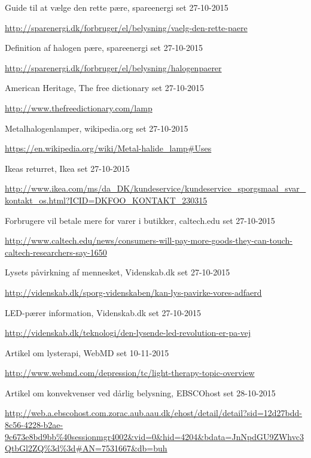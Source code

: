 \begin{thebibliography}{99}
  Guide til at vælge den rette pære,
  spareenergi
  set 27-10-2015
  
  \url{http://sparenergi.dk/forbruger/el/belysning/vaelg-den-rette-paere}

  Definition af halogen pære,
  spareenergi
  set 27-10-2015
  
  \url{http://sparenergi.dk/forbruger/el/belysning/halogenpaerer}

  American Heritage,
  The free dictionary
  set 27-10-2015
  
  \url{http://www.thefreedictionary.com/lamp}

  Metalhalogenlamper,
  wikipedia.org
  set 27-10-2015
  
  \url{https://en.wikipedia.org/wiki/Metal-halide_lamp#Uses}

  Ikeas returret,
  Ikea
  set 27-10-2015
  
  \url{http://www.ikea.com/ms/da_DK/kundeservice/kundeservice_sporgsmaal_svar_kontakt_os.html?ICID=DKFOO_KONTAKT_230315}


  Forbrugere vil betale mere for varer i butikker,
  caltech.edu
  set 27-10-2015
  
  \url{http://www.caltech.edu/news/consumers-will-pay-more-goods-they-can-touch-caltech-researchers-say-1650}

  Lysets påvirkning af mennesket,
  Videnskab.dk
  set 27-10-2015
  
  \url{http://videnskab.dk/sporg-videnskaben/kan-lys-pavirke-vores-adfaerd}

  LED-pærer information,
  Videnskab.dk
  set 27-10-2015
  
  \url{http://videnskab.dk/teknologi/den-lysende-led-revolution-er-pa-vej}

  Artikel om lysterapi,
  WebMD
  set 10-11-2015
  
  \url{http://www.webmd.com/depression/tc/light-therapy-topic-overview}

  Artikel om konvekvenser ved dårlig belysning,
  EBSCOhost
  set 28-10-2015
  
  \url{http://web.a.ebscohost.com.zorac.aub.aau.dk/ehost/detail/detail?sid=12d27bdd-8c56-4228-b2ae-9c673e8bd9bb%40sessionmgr4002&vid=0&hid=4204&bdata=JnNpdGU9ZWhvc3QtbGl2ZQ%3d%3d#AN=7531667&db=buh}
  

\end{thebibliography}
